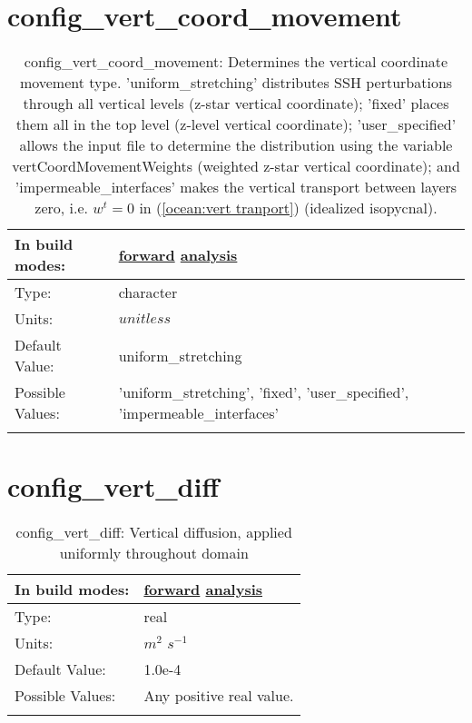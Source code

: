 \section[config\_vert\_coord\_movement]{config\_vert\_coord\_movement}
\label{sec:nm_sec_config_vert_coord_movement}
\begin{center}
\begin{longtable}{| p{2.0in} || p{4.0in} |}
    \hline
    In build modes: & \hyperref[subsec:forward_nm_tab_ALE_vertical_grid]{forward} \hyperref[subsec:analysis_nm_tab_ALE_vertical_grid]{analysis} \\
    \hline
    Type: & character \\
    \hline
    Units: & $unitless$ \\
    \hline
    Default Value: & uniform\_stretching \\
    \hline
    Possible Values: & 'uniform\_stretching', 'fixed', 'user\_specified', 'impermeable\_interfaces' \\
    \hline
    \caption{config\_vert\_coord\_movement:  Determines the vertical coordinate movement type. 'uniform\_stretching' distributes SSH perturbations through all vertical levels (z-star vertical coordinate); 'fixed' places them all in the top level (z-level vertical coordinate); 'user\_specified' allows the input file to determine the distribution using the variable vertCoordMovementWeights (weighted z-star vertical coordinate); and 'impermeable\_interfaces' makes the vertical transport between layers zero, i.e.  $w^t=0$  in (\ref{ocean:vert tranport}) (idealized isopycnal).}
\end{longtable}
\end{center}
\section[config\_vert\_diff]{config\_vert\_diff}
\label{sec:nm_sec_config_vert_diff}
\begin{center}
\begin{longtable}{| p{2.0in} || p{4.0in} |}
    \hline
    In build modes: & \hyperref[subsec:forward_nm_tab_vmix_const]{forward} \hyperref[subsec:analysis_nm_tab_vmix_const]{analysis} \\
    \hline
    Type: & real \\
    \hline
    Units: & $m^2$ $s^{-1}$ \\
    \hline
    Default Value: & 1.0e-4 \\
    \hline
    Possible Values: & Any positive real value. \\
    \hline
    \caption{config\_vert\_diff: Vertical diffusion, applied uniformly throughout domain}
\end{longtable}
\end{center}
